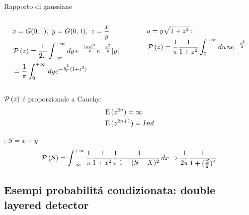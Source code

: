 \documentclass[asd-beamer.tex]{subfiles}%
\begin{document}
\begin{wordonframe}{Rapporto di gaussiane}
	\begin{columns}[T]
		\begin{column}{0.5\textwidth}
			\begin{align*}
			&x=G{(0,1)},\ y=G{(0,1)},\ z=\frac{x}{y}\\
            &\operatorname{\mathcal{P}}{(z)}=\frac{1}{2\pi}\int_{-\infty}^{+\infty}{}dy\,e^{-\frac{(zy)^2}{2}}e^{-\frac{y^2}{2}}|y|\\
			&=\frac{1}{\pi}\int_{0}^{+\infty}{}\,dye^{-\frac{y^2}{2}(1+z^2)}
			\end{align*}
		\end{column}
		\begin{column}{0.5\textwidth}
			\begin{align*}
			&u=y\sqrt{1+z^2}:\\
			&\operatorname{\mathcal{P}}{(z)}=\frac{1}{\pi}\frac{1}{1+z^2}\int_{0}^{+\infty}{}du\,ue^{-\frac{u^2}{2}}
			\end{align*}
		\end{column}
	\end{columns}
	$\operatorname{\mathcal{P}}{(z)}$ \'e proporzionale a Cauchy:
	\begin{align*}
        &\operatorname{E}{(z^{2n})}=\infty\\
	&\operatorname{E}{(z^{2n+1})}=Ind
	\end{align*}
	\begin{block}{: $S=x+y$}
		\[\operatorname{\mathcal{P}}{(S)}=\int_{-\infty}^{+\infty}\frac{1}{\pi}\frac{1}{1+x^2}\frac{1}{\pi}\frac{1}{1+(S-X)^2}\,dx\to\frac{1}{2\pi}\frac{1}{1+(\frac{S}{2})^2}\]
	\end{block}
\end{wordonframe}

\subsection{Esempi probabilit\'a condizionata: double layered detector}
	
\end{document}
